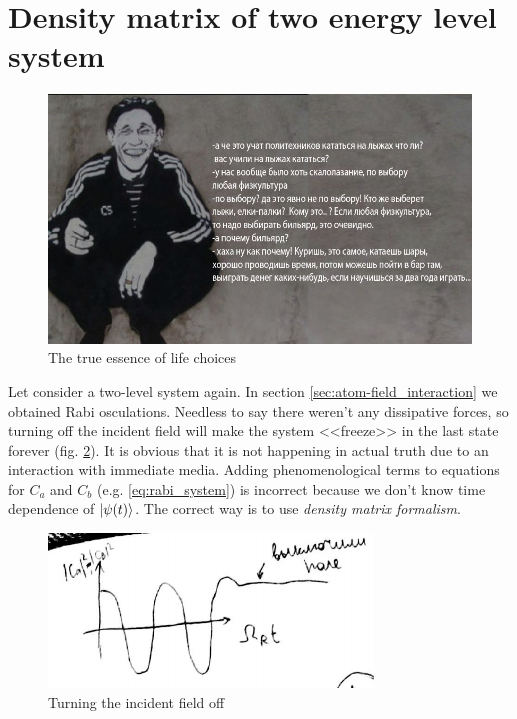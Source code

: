 \section{Density matrix of two energy level system}

\begin{figure}[h!]
	\centering
	\includegraphics[width=0.8\linewidth]{fig/L4/true_Baiko}
	\caption{The true essence of life choices}
	\label{fig:truebaiko}
\end{figure}

Let consider a two-level system again. In section \ref{sec:atom-field_interaction} we obtained Rabi osculations. Needless to say there weren't any dissipative forces, so turning off the incident field will make the system <<freeze>> in the last state forever (fig. \ref{fig:turnofffield}). It is obvious that it is not happening in actual truth due to an interaction with immediate media. Adding phenomenological terms to equations for $C_a$ and $C_b$ (e.g. \eqref{eq:rabi_system}) is incorrect because we don't know time dependence of $\lvert\psi(t)\rangle$. The correct way is to use \textit{density matrix formalism}.

\begin{figure}[h!]
	\centering
	\includegraphics[width=0.5\linewidth]{fig/L5/turn_off_field}
	\caption{Turning the incident field off}
	\label{fig:turnofffield}
\end{figure}


